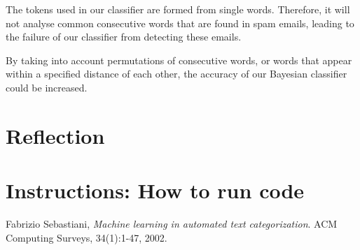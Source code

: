 \documentclass[10pt, a4paper]{article}
\begin{document}
The tokens used in our classifier are formed from single words. Therefore, it will not analyse common consecutive words that are found in spam emails, leading to the failure of our classifier from detecting these emails.

By taking into account permutations of consecutive words, or words that appear within a specified distance of each other, the accuracy of our Bayesian classifier could be increased.

\section{Reflection}

\section{Instructions: How to run code}

\begin{thebibliography}{9}

  Fabrizio Sebastiani,
  \emph{Machine learning in automated text categorization}.
  ACM Computing Surveys,
  34(1):1-47,
  2002.

\end{thebibliography}
\end{document}

